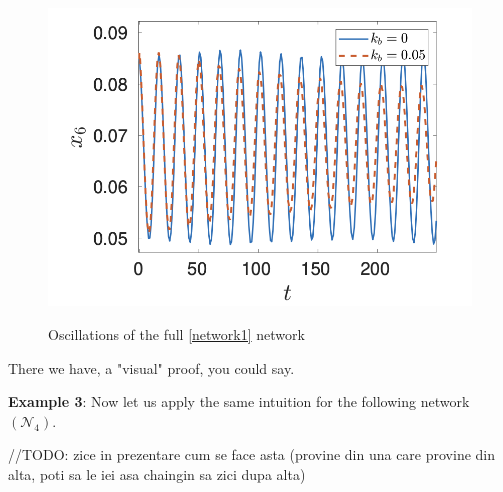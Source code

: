 \begin{figure}[H]
	\includegraphics[width=13cm]{math_pics/oscillations-full-network.png}
	\centering
	\label{fig:full_net_oscillations}
	\caption{Oscillations of the full \ref{network1} network}
\end{figure}

There we have, a "visual" proof, you could say.

\hfill\break
\hfill\break

\textbf{Example 3}:
Now let us apply the same intuition for the following network $(\mathcal{N}_4)$.

\hfill\break
//TODO: zice in prezentare cum se face asta (provine din una care provine din alta, poti sa le iei asa chaingin sa zici dupa alta)
\hfill\break

